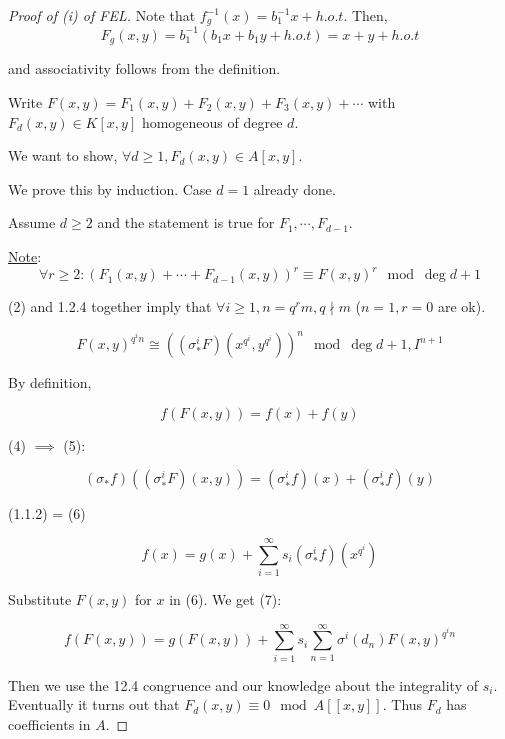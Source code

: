 \documentclass{article}
\theoremstyle{definition}
\numberwithin{theorem}{subsection}
\begin{document}
    \begin{proof}
        [Proof of (i) of FEL] Note that \(f_g ^{-1} (x) = b_1 ^{-1} x + h.o.t\). Then,
        \[
            F_g(x,y) = b_1 ^{-1} (b_1 x + b_1 y + h.o.t) = x + y + h.o.t \tag*{(1)}
        \]
        
        and associativity follows from the definition.

        Write \(F(x,y)=F_1(x,y)+F_2(x,y)+F_3(x,y) + \cdots\) with \(F_d(x,y) \in K[x,y]\) homogeneous of degree \(d\).

        We want to show, \(\forall d\geq 1, F_d(x,y) \in A[x,y]\).

        We prove this by induction. Case \(d=1\) already done.

        Assume \(d \geq 2\) and the statement is true for \(F_1, \cdots , F_{d-1}\).

        \underline{Note}:
        \[
            \forall r \geq 2: (F_1(x,y) + \cdots +F_{d-1} (x,y))^r \equiv F(x,y)^r \mod \deg d+1\tag*{(2)}
        \] 

        (2) and 1.2.4 together imply that \(\forall i \geq 1, n = q^r m, q \nmid m\) (\(n=1, r=0\) are ok).

        \[
            F(x,y)^{q^i n} \cong \left( (\sigma_{\ast}^i F) (x^{q^i},y^{q^i}) \right) ^ n \mod \deg d+1, I^{n+1} \tag*{(3)}
        \]

        By definition,

        \[
            f(F(x,y)) = f(x) + f(y) \tag*{(4)}
        \]

        (4) \(\implies\) (5):

        \[
            (\sigma_{\ast} f)((\sigma_{\ast} ^i F)(x,y)) = (\sigma_{\ast}^i f)(x) + (\sigma_{\ast}^i f)(y) \tag*{(5)}
        \]

        (1.1.2) = (6)

        \[
            f(x) = g(x) + \sum_{i=1}^{\infty} s_i (\sigma_{\ast}^i f)(x^{q^i}) \tag*{(6)}
        \]

        Substitute \(F(x,y)\) for \(x\) in (6). We get (7):

        \[
            f(F(x,y)) = g(F(x,y)) + \sum_{i=1}^{\infty} s_i \sum_{n=1}^{\infty} \sigma^i(d_n) F(x,y)^{q^i n} \tag*{(7)}
        \]

        Then we use the 12.4 congruence and our knowledge about the integrality of \(s_i\). Eventually it turns out that \(F_d(x,y) \equiv 0 \mod A[[x,y]]\). Thus \(F_d\) has coefficients in \(A\). 
        

\end{proof}
\end{document}

